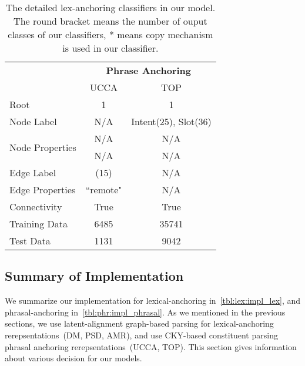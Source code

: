 \begin{table}[!tbp]
\caption{The detailed lex-anchoring classifiers in our model. The round bracket means the number of ouput classes of our classifiers, * means copy mechanism is
  used in our classifier.}
\label{tbl:phr:impl_phrasal}
\begin{center}
\begin{tabular}{l|cc}
\toprule
\hline
                                 & \multicolumn{2}{c}{{\bf Phrase Anchoring}} \\ \cline{2-3}
                                 & UCCA      & TOP                            \\ \hline
Root                             & 1         & 1                              \\ \hline
Node Label                       & N/A       & Intent(25), Slot(36)           \\ \hline
\multirow{2}{*}{Node Properties} & N/A       & N/A                            \\
                                 & N/A       & N/A                            \\ \hline
Edge Label                       & (15)      & N/A                            \\ \hline
Edge Properties                  & ``remote" & N/A                            \\ \hline
Connectivity                     & True      & True                           \\ \hline
Training Data                    & 6485      & 35741                          \\ \hline
Test Data                        & 1131      & 9042                           \\ \hline \bottomrule
\end{tabular}
\end{center}
\label{tbl:phr:impl_phrasal}
\end{table}

\subsection{Summary of Implementation}
\label{ssec:impl_summary}

We summarize our implementation for lexical-anchoring
in~\autoref{tbl:lex:impl_lex}, and phrasal-anchoring
in~\autoref{tbl:phr:impl_phrasal}. As we mentioned in the previous
sections, we use latent-alignment graph-based parsing for
lexical-anchoring rerepsentations~(DM, PSD, AMR), and use CKY-based
constituent parsing phrasal anchoring rerepsentations~(UCCA, TOP). This section
gives information about various decision for our models.

